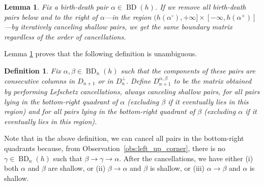 \documentclass[a4paper,12pt, USenglish,cleveref,autoref,thm-restate]{article}
\newtheorem{lemma}[theorem]{Lemma}
\newtheorem{definition}[theorem]{Definition}
\newcommand\michal[1]{\textcolor{magenta}{[ML: #1]}}
\newcommand\bartek[1]{\textcolor{violet}{[BF: #1]}}
\newcommand\dmitriy[1]{\textcolor{teal}{[DM: #1]}}
\newcommand{\mf}{h}
\DeclareMathOperator{\bd}{BD}
\newcommand{\hmB}{D}
\newcommand{\cmB}{D^{\perp}}
\newcommand{\mD}{D}
\newcommand{\bth}[1]{#1^\circ}
\newcommand{\dth}[1]{#1^{\!\times}}
\newcommand{\rel}{\rightarrow}
\newcommand{\bds}{\alpha}
\newcommand{\bdt}{\beta}
\newcommand{\bdb}{\gamma}
\begin{document}


\begin{lemma}\cite[Lemma 3.2]{TransDepth}\label{lem:order_not_important}
   Fix a birth-death pair $\bds \in \bd(\mf)$.
    If we remove all birth-death pairs below and to the right of $\bds$---in the region $(\mf(\bth\bds),+\infty]\times[-\infty,\mf(\dth\bds)]$---by iteratively canceling shallow pairs, we get the same boundary matrix regardless of the order of cancellations.
\end{lemma}

\noindent Lemma \ref{lem:order_not_important} proves that the following definition is unambiguous.


\begin{definition}

Fix $\bds,\bdt \in \bd_{n}(\mf)$ such that the components of these pairs are consecutive columns in $\hmB_{n+1}$ or in $\cmB_{n}$.  Define $\mD_{n+1}^{\bds,\bdt}$ to be the matrix obtained by performing Lefschetz cancellations, always canceling shallow pairs, for all pairs lying in the bottom-right quadrant of $\bds$ (excluding $\bdt$ if it eventually lies in this region) and for all pairs lying in the bottom-right quadrant of $\bdt$ (excluding $\bds$ if it eventually lies in this region).

\end{definition}

\noindent Note that in the above definition, we can cancel all pairs in the bottom-right quadrants because, from Observation~\ref{obs:left_up_corner}, there is no $\bdb \in \bd_{n}(\mf)$ such that $\bdt \rel \bdb \rel \bds$.
After the cancellations, we have either (i) both $\bds$ and $\bdt$ are shallow, or (ii) $\bdt \rel \bds$ and $\bdt$ is shallow, or (iii) $\bds \rel \bdt$ and $\bds$ is shallow.
\end{document}

